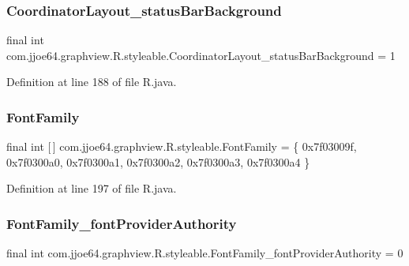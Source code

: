 \subsubsection{\texorpdfstring{CoordinatorLayout\_statusBarBackground}{CoordinatorLayout\_statusBarBackground}}
{\footnotesize\ttfamily final int com.\+jjoe64.\+graphview.\+R.\+styleable.\+Coordinator\+Layout\+\_\+status\+Bar\+Background = 1\hspace{0.3cm}{\ttfamily [static]}}



Definition at line 188 of file R.\+java.

\mbox{\label{classcom_1_1jjoe64_1_1graphview_1_1_r_1_1styleable_af37cf6f1fb22e5323b994d32b6583b7f}} 
\subsubsection{\texorpdfstring{FontFamily}{FontFamily}}
{\footnotesize\ttfamily final int \mbox{[}$\,$\mbox{]} com.\+jjoe64.\+graphview.\+R.\+styleable.\+Font\+Family = \{ 0x7f03009f, 0x7f0300a0, 0x7f0300a1, 0x7f0300a2, 0x7f0300a3, 0x7f0300a4 \}\hspace{0.3cm}{\ttfamily [static]}}



Definition at line 197 of file R.\+java.

\mbox{\label{classcom_1_1jjoe64_1_1graphview_1_1_r_1_1styleable_ad057041a8b4b0cc4849c8cba77d59d9a}} 
\subsubsection{\texorpdfstring{FontFamily\_fontProviderAuthority}{FontFamily\_fontProviderAuthority}}
{\footnotesize\ttfamily final int com.\+jjoe64.\+graphview.\+R.\+styleable.\+Font\+Family\+\_\+font\+Provider\+Authority = 0\hspace{0.3cm}{\ttfamily [static]}}



